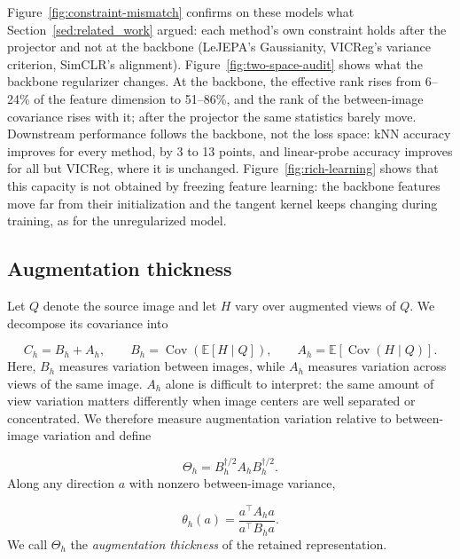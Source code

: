 Figure~\ref{fig:constraint-mismatch} confirms on these models what Section~\ref{sed:related_work} argued: each method's own constraint holds after the projector and not at the backbone (LeJEPA's Gaussianity, VICReg's variance criterion, SimCLR's alignment). Figure~\ref{fig:two-space-audit} shows what the backbone regularizer changes. At the backbone, the effective rank rises from 6--24\% of the feature dimension to 51--86\%, and the rank of the between-image covariance rises with it; after the projector the same statistics barely move. Downstream performance follows the backbone, not the loss space: kNN accuracy improves for every method, by 3 to 13 points, and linear-probe accuracy improves for all but VICReg, where it is unchanged. Figure~\ref{fig:rich-learning} shows that this capacity is not obtained by freezing feature learning: the backbone features move far from their initialization and the tangent kernel keeps changing during training, as for the unregularized model.

\subsection{Augmentation thickness}
\label{sec:exp-thickness}
Let $Q$ denote the source image and let $H$ vary over augmented views of $Q$. We decompose its covariance into

\begin{equation}
    C_h = B_h + A_h,
    \qquad
    B_h = \operatorname{Cov}\!\left(\mathbb{E}[H \mid Q]\right),
    \qquad
    A_h = \mathbb{E}\!\left[\operatorname{Cov}(H \mid Q)\right].
\end{equation}
Here, $B_h$ measures variation between images, while $A_h$ measures variation across views of the same image. $A_h$ alone is difficult to interpret: the same amount of view variation matters differently when image centers are well separated or concentrated. We therefore measure augmentation variation relative to between-image variation and define

\begin{equation}
    \Theta_h
    =
    B_h^{\dagger/2} A_h B_h^{\dagger/2}.
    \label{eq:thickness}
\end{equation}
Along any direction $a$ with nonzero between-image variance,

\begin{equation}
    \theta_h(a)
    =
    \frac{a^\top A_h a}{a^\top B_h a}.
\end{equation}
We call $\Theta_h$ the \emph{augmentation thickness} of the retained representation.

